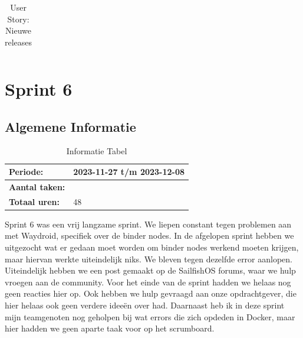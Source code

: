 \documentclass[a4paper]{report}
\begin{document}
\begin{tcolorbox}
\begin{table}[H]
\begin{tabularx}{1\textwidth}{|X|X|}
  \end{tabularx}
  \caption{User Story: Nieuwe releases}
\label{table:it5:new_releases}
\end{table}
\end{tcolorbox}



\chapter{Sprint 6}
\section{Algemene Informatie}
\begin{table}[H]
\begin{tabularx}{0.6\textwidth}{|X|X|}
  \hline
  \cellcolor[HTML]{99ccff} \textbf{Periode:} & 2023-11-27 t/m 2023-12-08 \\ 
  \hline
  \cellcolor[HTML]{99ccff} \textbf{Aantal taken:} &  \\ 
  \hline
  \cellcolor[HTML]{99ccff} \textbf{Totaal uren:} & 48 \\ 
  \hline
\end{tabularx}
\caption{Informatie Tabel}
\label{table:it6:general}
\end{table}
Sprint 6 was een vrij langzame sprint. We liepen constant tegen problemen aan met Waydroid, specifiek over de binder nodes.
In de afgelopen sprint hebben we uitgezocht wat er gedaan moet worden om binder nodes werkend moeten krijgen, maar hiervan werkte uiteindelijk niks. 
We bleven tegen dezelfde error aanlopen.
Uiteindelijk hebben we een post gemaakt op de SailfishOS forums, waar we hulp vroegen aan de community. 
Voor het einde van de sprint hadden we helaas nog geen reacties hier op.
Ook hebben we hulp gevraagd aan onze opdrachtgever, die hier helaas ook geen verdere ideeën over had.
Daarnaast heb ik in deze sprint mijn teamgenoten nog geholpen bij wat errors die zich opdeden in Docker, maar hier hadden we geen aparte taak voor op het scrumboard.
\end{document}
